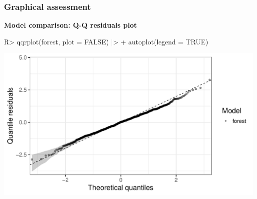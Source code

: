 \documentclass[11pt,t,usepdftitle=false,aspectratio=169]{beamer}
\begin{document}
\begin{frame}[fragile]
\frametitle{Graphical assessment}

\vspace{-0.75em}

\textbf{Model comparison: Q-Q residuals plot}

\vspace{0.5em}

\begin{Schunk}
\begin{Sinput}
R> qqrplot(forest, plot = FALSE) |>
+    autoplot(legend = TRUE)
\end{Sinput}
\end{Schunk}

\begin{center}
\includegraphics{slides-rain_topmodels_lm_qqrplot1}
\end{center}

\end{frame}
\end{document}
